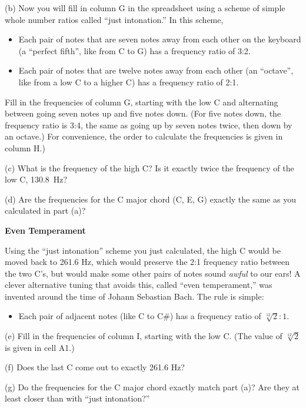 (b) Now you will fill in column G in the spreadsheet using a scheme of simple whole number ratios called ``just intonation.'' In this scheme, 
\begin{itemize}[nosep]
\item Each pair of notes that are seven notes away from each other on the keyboard (a ``perfect fifth'', like from C to G) has a frequency ratio of 3:2.
\item Each pair of notes that are twelve notes away from each other (an ``octave'', like from a low C to a higher C) has a frequency ratio of 2:1.  
\end{itemize}
Fill in the frequencies of column G, starting with the low C and alternating between going seven notes up and five notes down.  (For five notes down, the frequency ratio is 3:4, the same as going up by seven notes twice, then down by an octave.) For convenience, the order to calculate the frequencies is given in column H.)

(c) What is the frequency of the high C? Is it exactly twice the frequency of the low C, 130.8~Hz?
\answerspace{0.3in}

(d) Are the frequencies for the C major chord (C, E, G) exactly the same as you calculated in part (a)?
\answerspace{0.3in}

\textbf{Even Temperament}

Using the ``just intonation'' scheme you just calculated, the high C would be moved back to 261.6 Hz, which would preserve the 2:1 frequency ratio between the two C's, but would make some other pairs of notes sound \textit{awful} to our ears!  A clever alternative tuning that avoids this, called ``even temperament,'' was invented around the time of Johann Sebastian Bach.  The rule is simple:
\begin{itemize}[nosep]
\item Each pair of adjacent notes (like C to C\#) has a frequency ratio of $\sqrt[12]{2}:1$.
\end{itemize}

(e) Fill in the frequencies of column I, starting with the low C.  (The value of $\sqrt[12]{2}$ is given in cell A1.)

(f) Does the last C come out to exactly 261.6 Hz?
\answerspace{0.3in}

(g) Do the frequencies for the C major chord exactly match part (a)?  Are they at least closer than with ``just intonation?''
\answerspace{0.3in}
